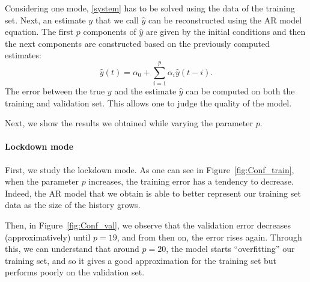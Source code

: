 \documentclass[11pt]{article}
\begin{document}
Considering one mode, \eqref{system} has to be solved using the data of the training set. Next, an estimate $y$ that we call $\hat{y}$ can be reconstructed using the AR model equation. The first $p$ components of $\hat{y}$ are given by the initial conditions and then the next components are constructed based on the previously computed estimates:
\begin{equation*}
\hat{y}(t)=\alpha_0+\sum_{i=1}^p \alpha_i\hat{y}(t-i).
\end{equation*}
The error between the true $y$ and the estimate $\hat{y}$ can be computed on both the training and validation set. This allows one to judge the quality of the model.

Next, we show the results we obtained while varying the parameter \(p\).

\paragraph{Lockdown mode}
First, we study the lockdown mode.
As one can see in Figure~\ref{fig:Conf_train}, when the parameter \(p\) increases, the training error has a tendency to decrease. Indeed, the AR model that we obtain is able to better represent our training set data as the size of the history grows.

Then, in Figure~\ref{fig:Conf_val}, we observe that the validation error decreases (approximatively) until \(p = 19\), and from then on, the error rises again. Through this, we can understand that around \(p = 20\), the model starts ``overfitting'' our training set, and so it gives a good approximation for the training set but performs poorly on the validation set.
\end{document}
